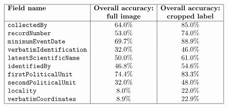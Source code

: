 \documentclass{article}
\begin{document}
$$
\begin{array}{|l|c|c|}
\hline
\textbf{Field name} & \textbf{Overall accuracy:} & \textbf{Overall accuracy:} \\
                    & \textbf{full image}        & \textbf{cropped label}     \\
\hline
\texttt{collectedBy}           & 64.0\% & 85.0\% \\
\texttt{recordNumber}          & 53.0\% & 74.0\% \\
\texttt{minimumEventDate}      & 69.7\% & 88.9\% \\
\texttt{verbatimIdentification}& 32.0\% & 46.0\% \\
\texttt{latestScientificName}  & 50.0\% & 61.0\% \\
\texttt{identifiedBy}          & 46.8\% & 54.6\% \\
\texttt{firstPoliticalUnit}    & 74.4\% & 83.3\% \\
\texttt{secondPoliticalUnit}   & 32.0\% & 48.0\% \\
\texttt{locality}              & 8.0\%  & 22.0\% \\
\texttt{verbatimCoordinates}   & 8.9\%  & 22.9\% \\
\hline
\end{array}
$$
\end{document}
